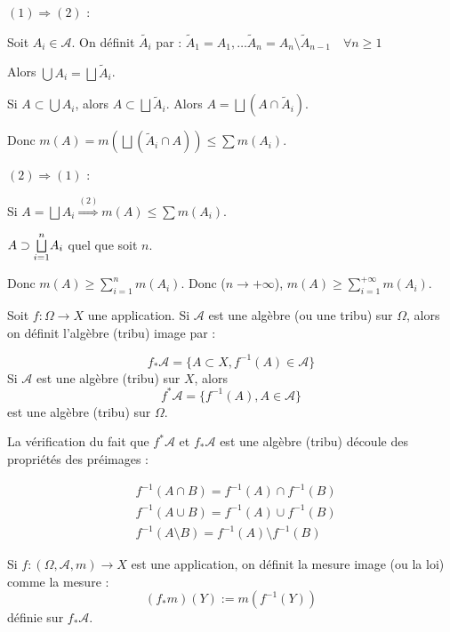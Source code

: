 \documentclass[10pt,a4paper,notitlepage ]{report}
\begin{document}
\begin{demo}
	$(1) \Rightarrow (2)$ :
	
	Soit $A_i \in \mathcal A$. On définit $\tilde{A_i}$ par : $\tilde A_1 = A_1, \dots \tilde A_n = A_n\setminus \tilde A_{n-1} \quad \forall n \ge 1$
	
	Alors $\bigcup A_i = \bigsqcup \tilde A_i$.
	
	Si $A \subset \bigcup A_i$, alors $A \subset \bigsqcup \tilde A_i$. Alors $A=\bigsqcup(A\cap\tilde A_i)$.
	
	Donc $m(A)=m(\bigsqcup (\tilde A_i \cap A)) \le \sum m(A_i)$.

	$(2) \Rightarrow (1)$ :
	
	Si $A=\bigsqcup A_i \overset{(2)}{\Rightarrow} m(A) \le \sum m(A_i)$.
	
	$A\supset\overunderset{n}{i=1}{\bigsqcup}A_i$ quel que soit $n$.
	
	Donc $m(A) \ge \sum_{i=1}^n m(A_i)$. Donc ($n \rightarrow +\infty$), $m(A) \ge \sum_{i=1}^{+\infty}m(A_i)$.
	
\end{demo}

\begin{definition}
	Soit $f:\Omega \rightarrow X$ une application. Si $\mathcal A$ est une algèbre (ou une tribu) sur $\Omega$, alors on définit l'algèbre (tribu) image par :
	
\[ f_*\mathcal A = \{A\subset X, f^{-1}(A)\in \mathcal A\}\]
	Si $\mathcal A$ est une algèbre (tribu) sur $X$, alors \[f^*\mathcal A = \{f^{-1}(A), A\in\mathcal A\}\] est une algèbre (tribu) sur $\Omega$.
\end{definition}

La vérification du fait que $f^*\mathcal A$ et $f_*\mathcal A$ est une algèbre (tribu) découle des propriétés des préimages :

\begin{align*}
	&f^{-1}(A\cap B) = f^{-1}(A)\cap f^{-1}(B) \\
	&f^{-1}(A \cup B) = f^{-1}(A) \cup f^{-1}(B) \\
	&f^{-1}(A \setminus B) = f^{-1}(A) \setminus f^{-1}(B) 
\end{align*}

\begin{definition}
	Si $f:(\Omega, \mathcal A, m) \rightarrow X$ est une application, on définit la mesure image (ou la loi) comme la mesure :
	\[ (f_*m)(Y) := m(f^{-1}(Y))\] définie sur $f_*\mathcal A$.
\end{definition}
\end{document}
